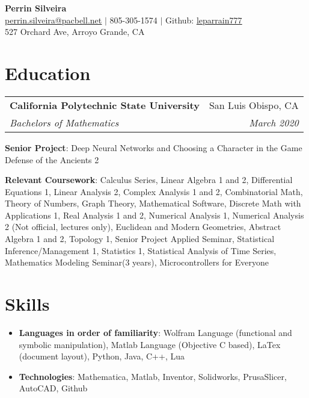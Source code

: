 \documentclass[letterpaper,10pt]{article}
\makeatletter
\newcommand{\resumeItemNoBullet}[2]{
  \item[]\small{
    \hspace{-9pt}\textbf{#1}{: #2 \vspace{-6pt}}
  }
}
\newcommand{\resumeSubheading}[4]{
  \vspace{-1pt}\item[]
  \begin{tabular*}{0.98\textwidth}{l@{\extracolsep{\fill}}r}
      \hspace{-10pt}\textbf{#1} & #2 \\
      \hspace{-10pt}\textit{\small#3} & \textit{\small #4} \\
    \end{tabular*}\vspace{-5pt}
}
\newcommand{\resumeSubHeadingListStart}{\begin{itemize}[leftmargin=*]}
\newcommand{\resumeSubHeadingListEnd}{\end{itemize}}
\newcommand{\shorterSection}[1]{\vspace{-10pt}\section{#1}}
\makeatother
\begin{document}
\begin{center}
  \small \textbf{{\huge Perrin Silveira}} \\  \href{mailto:perrin.silveira@pacbell.net}{\color{blue}\underline{perrin.silveira@pacbell.net}} $\vert$
  805-305-1574 $\vert$
  Github: \href{https://github.com/leparrain777}{\color{blue}\underline{leparrain777}} \\
  \small 527 Orchard Ave, Arroyo Grande, CA
\end{center}

\shorterSection{Education}
  \resumeSubHeadingListStart
    \resumeSubheading
      {California Polytechnic State University}{San Luis Obispo, CA}
      {Bachelors of Mathematics}{March 2020}{
      \resumeItemNoBullet{Senior Project}{Deep Neural Networks and Choosing a Character in the Game Defense of the Ancients 2}
      \resumeItemNoBullet{Relevant Coursework}{Calculus Series, Linear Algebra 1 and 2, Differential Equations 1, Linear Analysis 2, Complex Analysis 1 and 2, Combinatorial Math, Theory of Numbers, Graph Theory, Mathematical Software, Discrete Math with Applications 1, Real Analysis 1 and 2, Numerical Analysis 1, Numerical Analysis 2 (Not official, lectures only), Euclidean and Modern Geometries, Abstract Algebra 1 and 2, Topology 1, Senior Project Applied Seminar, Statistical Inference/Management 1, Statistics 1, Statistical Analysis of Time Series, Mathematics Modeling Seminar(3 years), Microcontrollers for Everyone}
    }
  \resumeSubHeadingListEnd

\shorterSection{Skills}
  \resumeSubHeadingListStart
  \small
    \item{
     \textbf{Languages in order of familiarity}{: Wolfram Language (functional and symbolic manipulation),  Matlab Language (Objective C based), LaTex (document layout), Python, Java, C++, Lua }}
     \item{
     \textbf{Technologies}{: Mathematica, Matlab, Inventor, Solidworks, PrusaSlicer, AutoCAD, Github}
    }
\resumeSubHeadingListEnd
\end{document}
